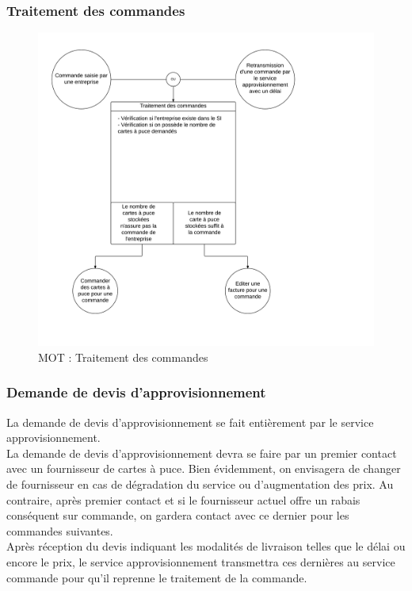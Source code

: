 \subsubsection{Traitement des commandes}
\begin{figure}[ht]
    \centering
    \includegraphics[width=\textwidth]{mot-traitement-commandes}
    \caption{MOT : Traitement des commandes}
    \label{fig:mot-traitement-commandes}
\end{figure}

\subsubsection{Demande de devis d'approvisionnement}

La demande de devis d'approvisionnement se fait entièrement par le service
approvisionnement. \\

La demande de devis d'approvisionnement devra se faire par un premier
contact avec un fournisseur de cartes à puce. Bien évidemment, on
envisagera de changer de fournisseur en cas de dégradation du service ou
d'augmentation des prix. Au contraire, après premier contact et si le
fournisseur actuel offre un rabais conséquent sur commande, on gardera contact
avec ce dernier pour les commandes suivantes. \\

Après réception du devis indiquant les modalités de livraison telles que le
délai ou encore le prix, le service approvisionnement transmettra ces dernières
au service commande pour qu'il reprenne le traitement de la commande.

